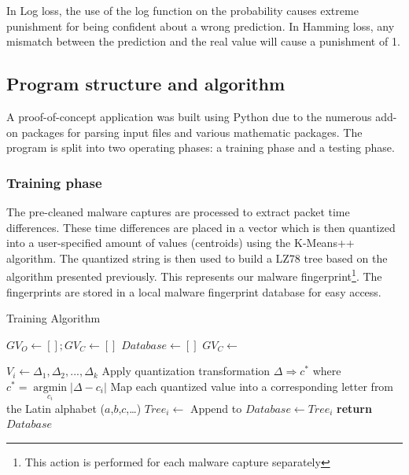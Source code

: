 \documentclass[9pt,journal,compsoc]{IEEEtran}
\begin{document}
In Log loss, the use of the log function on the probability causes extreme punishment for being confident about a wrong prediction.
In Hamming loss, any mismatch between the prediction and the real value will cause a punishment of 1.

\subsection{Program structure and algorithm}
A proof-of-concept application was built using Python due to the numerous add-on packages for parsing input files and various mathematic packages.
The program is split into two operating phases: a training phase and a testing phase.

\subsubsection{Training phase}\label{section:trainingp}
The pre-cleaned malware captures are processed to extract packet time differences.
These time differences are placed in a vector which is then quantized into a user-specified amount of values (centroids) using the K-Means++ algorithm. 
The quantized string is then used to build a LZ78 tree based on the algorithm presented previously. This represents our malware fingerprint\footnote{This action is performed for each malware capture separately}.
The fingerprints are stored in a local malware fingerprint database for easy access.
\begin{algorithm}
\caption{Training Algorithm}\label{alg:training}
\begin{algorithmic}[1]
\State ${GV}_O\gets[]; {GV}_C\gets[]$
\State ${Database}\gets[]$
   	\State {}
   \EndFor
   \State ${GV}_C\gets$

   	\State $V_i\gets\Delta_1,\Delta_2,...,\Delta_k$
   	\State Apply quantization transformation $
   	\Delta  \Rightarrow {c^*}$ where ${c^*} = \mathop {\arg \min }\limits_{{c_i}} \left| {\Delta  - {c_i}} \right|$
   	\State Map each quantized value  into a corresponding letter from the Latin alphabet ($a$,$b$,$c$,…)
   	\State ${Tree}_i\gets$
    \State Append to ${Database}\gets{Tree}_i$ \label{alg:training:append_db}
   \EndFor
   \State \textbf{return} $Database$
\EndProcedure
\end{algorithmic}
\end{algorithm}
\end{document}
